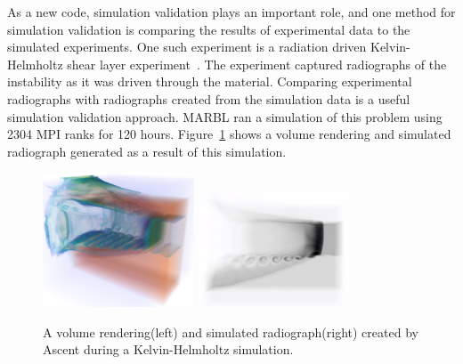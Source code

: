 As a new code, simulation validation plays an important role, and one method
for simulation validation is comparing the results of experimental data to the
simulated experiments.
%
One such experiment is a radiation driven Kelvin-Helmholtz shear
layer experiment~\cite{hurricane2009high}.
%
The experiment captured radiographs of the instability as it was driven through
the material. Comparing experimental radiographs with radiographs created from
the simulation data is a useful simulation validation approach.
%
MARBL ran a simulation of this problem using 2304 MPI ranks for 120 hours.
%
Figure~\ref{img:radkh} shows a volume rendering and simulated radiograph
generated as a result of this simulation.
%
\begin{figure}
\centering
\includegraphics[width=0.4\textwidth]{images/radkh}
\includegraphics[width=0.4\textwidth]{images/radkh_xray}
  \caption{\label{img:radkh}A volume rendering(left) and simulated radiograph(right) created by
Ascent during a Kelvin-Helmholtz simulation.}
\end{figure}

%



